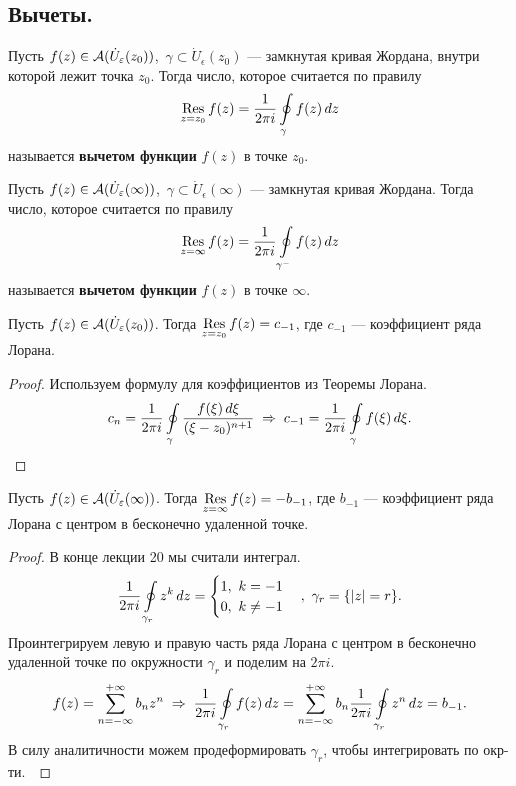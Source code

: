 	\subsection{Вычеты.}
	\begin{definition}
		Пусть $f(z)\in\mathcal{A}(\dot U_\varepsilon(z_0))$,\ $\gamma\subset\dot U_\epsilon(z_0)$ --- замкнутая кривая Жордана, внутри которой лежит точка $z_0$. Тогда число, которое считается по правилу
		\[ \mathop{\operatorname{Res}}\limits_{z=z_0} f(z) = \frac{1}{2\pi i}\oint\limits_\gamma f(z)\,dz \]
		называется \textbf{вычетом функции} $f(z)$ в точке $z_0$.
	\end{definition}
	\begin{definition}
		Пусть $f(z)\in\mathcal{A}(\dot U_\varepsilon(\infty))$,\ $\gamma\subset\dot U_\epsilon(\infty)$ --- замкнутая кривая Жордана. Тогда число, которое считается по правилу
		\[ \mathop{\operatorname{Res}}\limits_{z=\infty} f(z) = \frac{1}{2\pi i}\oint\limits_{\gamma^-} f(z)\,dz \]
		называется \textbf{вычетом функции} $f(z)$ в точке $\infty$.
	\end{definition}
	\begin{statement}
		Пусть $f(z)\in\mathcal{A}(\dot U_\varepsilon(z_0))$. Тогда $\mathop{\operatorname{Res}}\limits_{z=z_0}f(z) = c_{-1}$, где $c_{-1}$ --- коэффициент ряда Лорана.
	\end{statement}
	\begin{proof}
		Используем формулу для коэффициентов из Теоремы Лорана.
		\[ c_n = \frac{1}{2\pi i}\oint\limits_\gamma\frac{f(\xi)\, d\xi}{(\xi - z_0)^{n+1}}\;\Rightarrow\; c_{-1} = \frac{1}{2\pi i}\oint\limits_\gamma f(\xi)\, d\xi. \]
	\end{proof}
	\vspace{-\baselineskip}
	\begin{statement}
		Пусть $f(z)\in\mathcal{A}(\dot U_\varepsilon(\infty))$. Тогда $\mathop{\operatorname{Res}}\limits_{z=\infty}f(z) = -b_{-1}$, где $b_{-1}$ --- коэффициент ряда Лорана с центром в бесконечно удаленной точке.
	\end{statement}
	\begin{proof}
		В конце лекции 20 мы считали интеграл.
		\[ \frac{1}{2\pi i}\oint\limits_{\gamma_r}z^k\,dz = \begin{cases} 1,\ k = -1\\0,\ k\ne-1 \end{cases},\ \gamma_r = \{ |z|=r \}. \]
		Проинтегрируем левую и правую часть ряда Лорана с центром в бесконечно удаленной точке по окружности $\gamma_r$ и поделим на $2\pi i$.
		\[ f(z) = \sum\limits_{n=-\infty}^{+\infty}b_nz^n \;\Rightarrow\; \frac{1}{2\pi i}\oint\limits_{\gamma_r}f(z)\,dz = \sum\limits_{n=-\infty}^{+\infty}b_n\frac{1}{2\pi i}\oint\limits_{\gamma_r}z^n\,dz = b_{-1}. \]
		В силу аналитичности можем продеформировать $\gamma_r$, чтобы интегрировать по окр-ти.~
	\end{proof}
